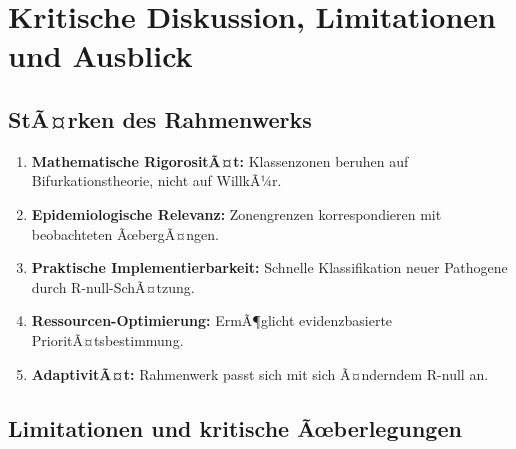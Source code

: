 ﻿\documentclass[a4paper,12pt,twoside]{article}
\theoremstyle{definition}
\begin{document}
\section{Kritische Diskussion, Limitationen und Ausblick}
\label{sec:discussion}

\subsection{StÃ¤rken des Rahmenwerks}

\begin{enumerate}
\item \textbf{Mathematische RigorositÃ¤t:} Klassenzonen beruhen auf Bifurkationstheorie, nicht auf WillkÃ¼r.
\item \textbf{Epidemiologische Relevanz:} Zonengrenzen korrespondieren mit beobachteten ÃœbergÃ¤ngen.
\item \textbf{Praktische Implementierbarkeit:} Schnelle Klassifikation neuer Pathogene durch R-null-SchÃ¤tzung.
\item \textbf{Ressourcen-Optimierung:} ErmÃ¶glicht evidenzbasierte PrioritÃ¤tsbestimmung.
\item \textbf{AdaptivitÃ¤t:} Rahmenwerk passt sich mit sich Ã¤nderndem R-null an.
\end{enumerate}

\subsection{Limitationen und kritische Ãœberlegungen}
\end{document}
